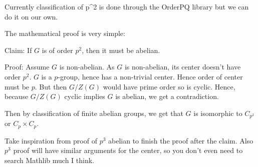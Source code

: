 Currently classification of p^2 is done through the OrderPQ library but we can do it on our own.

The mathematical proof is very simple:

Claim: If $G$ is of order $p^2$, then it must be abelian.

Proof: Assume $G$ is non-abelian. As $G$ is non-abelian, its center doesn't have order $p^2$. $G$ is a $p$-group, hence has a non-trivial center. Hence order of center must be $p$. But then $G/Z(G)$ would have prime order so is cyclic. Hence, because $G/Z(G)$ cyclic implies $G$ is abelian, we get a contradiction.

Then by classification of finite abelian groups, we get that $G$ is isomorphic to $C_{p^2}$ or $C_p \times C_p$.

Take inspiration from proof of $p^3$ abelian to finish the proof after the claim. Also $p^3$ proof will have similar arguments for the center, so you don't even need to search Mathlib much I think.